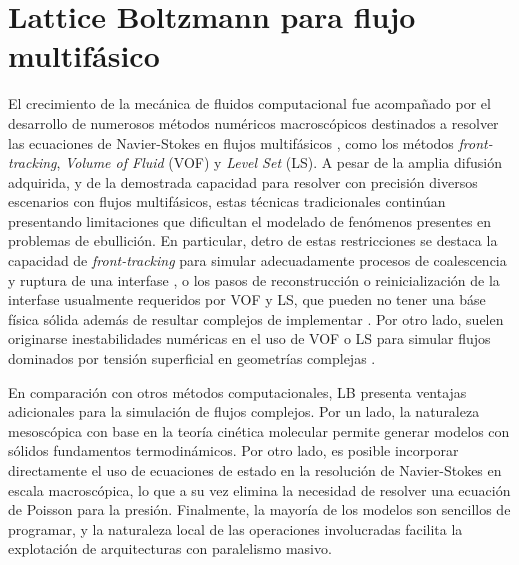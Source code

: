 \section{Lattice Boltzmann para flujo multif\'asico}
El crecimiento de la mec\'anica de fluidos computacional fue acompa\~nado por el desarrollo de numerosos m\'etodos num\'ericos macrosc\'opicos destinados a resolver las ecuaciones de Navier-Stokes en flujos multif\'asicos \cite{scardovelli_direct_1999}, como los m\'etodos \emph{front-tracking}, \emph{Volume of Fluid} (VOF) y \emph{Level Set} (LS). A pesar de la amplia difusi\'on adquirida, y de la demostrada capacidad para resolver con precisi\'on diversos escenarios con flujos multif\'asicos, estas t\'ecnicas tradicionales contin\'uan presentando limitaciones que dificultan el modelado de fen\'omenos presentes en problemas de ebullici\'on. En particular, detro de estas restricciones se destaca la capacidad de \emph{front-tracking} para simular adecuadamente procesos de coalescencia y ruptura de una interfase \cite{scardovelli_direct_1999,liu_three-dimensional_2012}, o los pasos de reconstrucci\'on o reinicializaci\'on de la interfase usualmente requeridos por VOF y LS, que pueden no tener una b\'ase f\'isica s\'olida adem\'as de resultar complejos de implementar \cite{liu_three-dimensional_2012}. Por otro lado, suelen originarse inestabilidades num\'ericas en el uso de VOF o LS para simular flujos dominados por tensi\'on superficial en geometr\'ias complejas \cite{scardovelli_direct_1999}.
\par
En comparaci\'on con otros m\'etodos computacionales, LB presenta ventajas adicionales para la simulaci\'on de flujos complejos. Por un lado, la naturaleza mesosc\'opica con base en la teor\'ia cin\'etica molecular permite generar modelos con s\'olidos fundamentos termodin\'amicos. Por otro lado, es posible incorporar directamente el uso de ecuaciones de estado en la resoluci\'on de Navier-Stokes en escala macrosc\'opica, lo que a su vez elimina la necesidad de resolver una ecuaci\'on de Poisson para la presi\'on. Finalmente, la mayor\'ia de los modelos son sencillos de programar, y la naturaleza local de las operaciones involucradas facilita la explotaci\'on de arquitecturas con paralelismo masivo.

